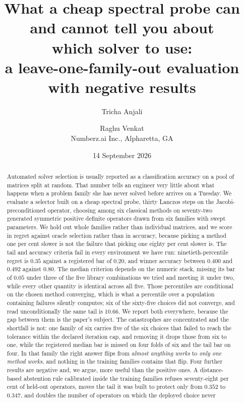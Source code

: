\documentclass[11pt]{article}
\title{What a cheap spectral probe can and cannot tell you about\\
which solver to use:\\
a leave-one-family-out evaluation with negative results}
\author{Tricha Anjali \and Raghu Venkat\\[2pt]
{\normalsize Numberz.ai Inc., Alpharetta, GA}}
\date{14 September 2026}
\begin{document}
\maketitle

\begin{abstract}
\noindent
Automated solver selection is usually reported as a classification accuracy on a
pool of matrices split at random. That number tells an engineer very little
about what happens when a problem family she has never solved before arrives on
a Tuesday. We evaluate a selector built on a cheap spectral probe,
thirty Lanczos steps on the Jacobi-\hspace{0pt}preconditioned operator, choosing among six
classical methods on seventy-two generated symmetric positive definite operators
drawn from six families with swept parameters. We hold out whole families rather
than individual matrices, and we score in regret against oracle selection rather
than in accuracy, because picking a method one per cent slower is not the failure
that picking one eighty per cent slower is. The tail and accuracy criteria fail in every
environment we have run: ninetieth-percentile regret is $0.35$ against a registered bar of
$0.20$, and winner accuracy between $0.400$ and $0.492$ against $0.80$. The median
criterion depends on the numeric stack, missing its bar of $0.05$ under three of the five
library combinations we tried and meeting it under two, while every other quantity is
identical across all five.
Those percentiles are conditional on the chosen method converging, which is what a
percentile over a population containing failures silently computes; six of the
sixty-five choices did not converge, and read unconditionally the same tail is
$10.66$. We report both everywhere, because the gap between them is the paper's
subject.
The catastrophes are concentrated and the
shortfall is not: one family of six carries five of the six choices that failed to
reach the tolerance within the declared iteration cap, and removing it drops those
from six to one, while the registered median bar is missed on four folds of six and
the tail bar on four. In that family the right answer flips from
\emph{almost anything works} to \emph{only one method works}, and nothing in the
training families contains that flip. Four further results are negative and, we
argue, more useful than the positive ones. A distance-based abstention rule
calibrated inside the training families refuses seventy-eight per cent of
held-out operators, moves the tail it was built to protect only from $0.352$ to
$0.347$, and doubles the number of operators on which the deployed choice never

\end{abstract}
\end{document}
